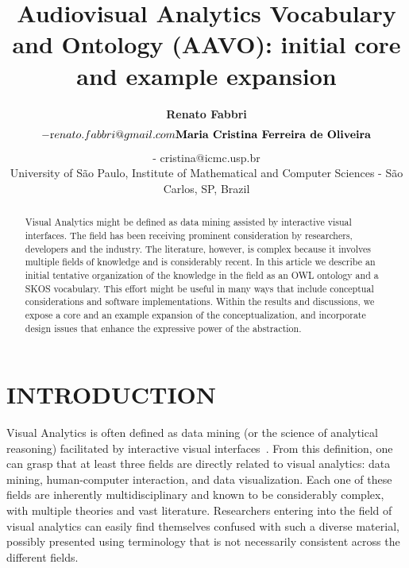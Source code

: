 \documentclass[12pt,fleqn]{article}
\title{Audiovisual Analytics Vocabulary and Ontology (AAVO): initial core and example expansion}
\author
    {\rm \begin{tabular}{l} 
    \textbf{Renato Fabbri}$$ - {\textnormal renato.fabbri@gmail.com}\\%
    \textbf{Maria Cristina Ferreira de Oliveira}$$ - {\textnormal cristina@icmc.usp.br}\\
    {\fontsize{11}{0}\selectfont University of São Paulo, Institute of Mathematical and Computer Sciences - São Carlos, SP, Brazil}\vspace*{-0.05cm} \\
  \end{tabular}}
\renewcommand{\headrulewidth}{0.0pt}
\begin{document}
\maketitle

\thispagestyle{firspagetstyle}

\renewcommand{\headrulewidth}{0.0pt}
\rhead{}

\begin{abstract}
Visual Analytics might be defined as data mining assisted by interactive visual interfaces.
The field has been receiving prominent consideration by researchers, developers and the industry. 
The literature, however, is complex because it involves multiple fields of knowledge
and is considerably recent.
In this article we describe an initial tentative organization of the knowledge in the field as an OWL ontology
and a SKOS vocabulary.
This effort might be useful in many ways that include conceptual considerations and
software implementations.
Within the results and discussions, we expose a core and an example expansion
of the conceptualization, and incorporate design issues that enhance the
expressive power of the abstraction. 
\end{abstract}


\pagestyle{fancy}

\section{INTRODUCTION}\label{sec:intro}
Visual Analytics is often defined as data mining (or the science of analytical reasoning)  facilitated by interactive visual interfaces~\citep{wikiVA,visMaster}.
% 
% 
% 
% 
%
From this definition, one can grasp that at least three fields are directly related to visual analytics:
data mining, human-computer interaction, and data visualization.
Each one of these fields are inherently multidisciplinary and known to be considerably complex,
with multiple theories and vast literature. Researchers entering into the field of visual analytics can easily find themselves confused with such a diverse material, possibly presented using  terminology that is not necessarily consistent across the different fields.   
\end{document}
